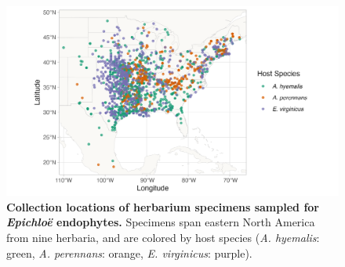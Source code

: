 \documentclass[11pt]{article}
\newcommand{\firstrevise}[1]{{\color{black}{#1}}}
\begin{document}
\begin{figure}[h]
	\centering
	\includegraphics[width = \linewidth]{../Plots/collections_map.png}
	\caption[Collection locations of herbarium specimens sampled for \emph{Epichloë} endophytes]{\textbf{Collection locations of herbarium specimens sampled for \emph{Epichloë} endophytes.} Specimens span eastern North America from nine herbaria, and are colored by host species (\emph{A. hyemalis}: green, \emph{A. perennans}: orange, \emph{E. virginicus}: purple). \firstrevise{Map lines delineate study areas and do not necessarily depict accepted national boundaries.}}
	\label{fig:map}
\end{figure}
\end{document}
